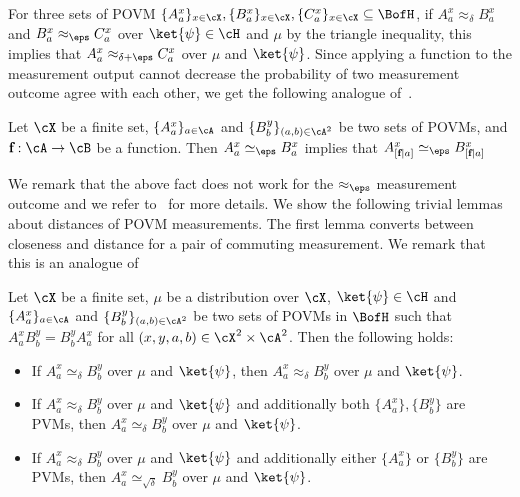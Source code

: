 For three sets of POVM $\{ A_a^x \}_{x \in \cX}, \{ B_a^x \}_{x \in \cX}, \{ C_a^x \}_{x \in \cX} \subseteq \BofH$, if $ A_a^x \approx_{\delta} B_a^x$ and $B_a^x \approx_{\eps} C_a^x $ over $\ket{\psi} \in \cH$ and $\mu$ by the triangle inequality, this implies that $A_a^x \approx_{\delta+ \eps} C_a^x $ over $\mu$ and $\ket{\psi}$. Since applying a function to the measurement output cannot decrease the probability of two measurement outcome agree with each other, we get the following analogue of~\cite[Fact 4.26]{natarajanNEEXPMIP2019a}.
\begin{fact} 
	Let $\cX$ be a finite set,  $\{ A_{a}^x \}_{a \in \cA}$ and  $\{ B_{b}^y \}_{(a,b) \in \cA^2}$ be two sets of POVMs, and $\textbf{f}: \cA \rightarrow \cB$ be a function. Then $A_a^x \simeq_{\eps} B_a^x$ implies that $A_{[\textbf{f}|a]}^x \simeq_{\eps} B_{[\textbf{f}|a]}^x$ 
\end{fact}
We remark that the above fact does not work for the $\approx_{\eps}$ measurement outcome and we refer to~\cite[Fact 4.26]{natarajanNEEXPMIP2019a} for more details. We show the following trivial lemmas about distances of POVM measurements. The first lemma converts between closeness and distance for a pair of commuting measurement. We remark that this is an analogue of~\cite[Fact 4.13, 4.14]{natarajanNEEXPMIP2019a}
\begin{lemma}\label{lem:closetodistance}
	Let $\cX$ be a finite set, $\mu$ be a distribution over $\cX$, $\ket{\psi} \in \cH$ and $\{ A_{a}^x \}_{a \in \cA}$ and  $\{ B_{b}^y \}_{(a,b) \in \cA^2}$ be two sets of POVMs in $\BofH$ such that $A_a^x B^y_b = B^y_b A_a^x$ for all $(x,y,a,b) \in \cX^2 \times \cA^2$. Then the following holds:
	\begin{itemize}
		\item If $A_a^x \simeq_{\delta} B^y_b$ over $\mu$ and $\ket{\psi}$, then $A_a^x \approx_{\delta} B^y_b$ over $\mu$ and $\ket{\psi}$.
		\item If $A_a^x \approx_{\delta} B^y_b$ over $\mu$ and $\ket{\psi}$ and additionally both $\{ A_{a}^x \}, \{ B_{b}^y \}$ are PVMs, then $A_a^x \simeq_{\delta} B^y_b$ over $\mu$ and $\ket{\psi}$.
		\item  If $A_a^x \approx_{\delta} B^y_b$ over $\mu$ and $\ket{\psi}$ and additionally either $\{ A_{a}^x \}$ or $\{ B_{b}^y \}$ are PVMs, then $A_a^x \simeq_{\sqrt{\delta}} B^y_b$ over $\mu$ and $\ket{\psi}$.
	\end{itemize}
\end{lemma} 
